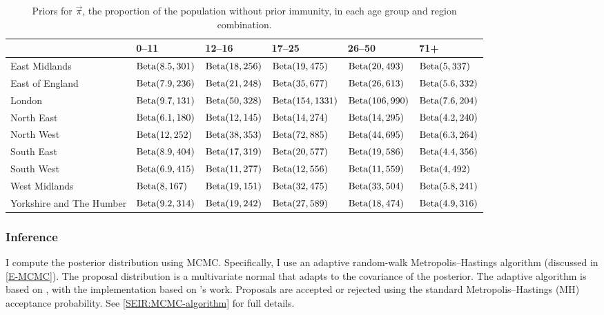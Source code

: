 \documentclass[thesis.tex]{subfiles}
\begin{document}
\begin{landscape}
\begin{table}
\centering
\begin{tabular}{l|lllll}
         & 0--11 & 12--16 & 17--25 & 26--50 & 71+ \\
        \hline
        East Midlands & $\operatorname{Beta}(8.5, 301)$ & $\operatorname{Beta}(18, 256)$ & $\operatorname{Beta}(19, 475)$ & $\operatorname{Beta}(20, 493)$ & $\operatorname{Beta}(5, 337)$ \\
        East of England & $\operatorname{Beta}(7.9, 236)$ & $\operatorname{Beta}(21, 248)$ & $\operatorname{Beta}(35, 677)$ & $\operatorname{Beta}(26, 613)$ & $\operatorname{Beta}(5.6, 332)$ \\
        London & $\operatorname{Beta}(9.7, 131)$ & $\operatorname{Beta}(50, 328)$ & $\operatorname{Beta}(154, 1331)$ & $\operatorname{Beta}(106, 990)$ & $\operatorname{Beta}(7.6, 204)$ \\
        North East & $\operatorname{Beta}(6.1, 180)$ & $\operatorname{Beta}(12, 145)$ & $\operatorname{Beta}(14, 274)$ & $\operatorname{Beta}(14, 295)$ & $\operatorname{Beta}(4.2, 240)$ \\
        North West & $\operatorname{Beta}(12, 252)$ & $\operatorname{Beta}(38, 353)$ & $\operatorname{Beta}(72, 885)$ & $\operatorname{Beta}(44, 695)$ & $\operatorname{Beta}(6.3, 264)$ \\
        South East & $\operatorname{Beta}(8.9, 404)$ & $\operatorname{Beta}(17, 319)$ & $\operatorname{Beta}(20, 577)$ & $\operatorname{Beta}(19, 586)$ & $\operatorname{Beta}(4.4, 356)$ \\
        South West & $\operatorname{Beta}(6.9, 415)$ & $\operatorname{Beta}(11, 277)$ & $\operatorname{Beta}(12, 556)$ & $\operatorname{Beta}(11, 559)$ & $\operatorname{Beta}(4, 492)$ \\
        West Midlands & $\operatorname{Beta}(8, 167)$ & $\operatorname{Beta}(19, 151)$ & $\operatorname{Beta}(32, 475)$ & $\operatorname{Beta}(33, 504)$ & $\operatorname{Beta}(5.8, 241)$ \\
        Yorkshire and The Humber & $\operatorname{Beta}(9.2, 314)$ & $\operatorname{Beta}(19, 242)$ & $\operatorname{Beta}(27, 589)$ & $\operatorname{Beta}(18, 474)$ & $\operatorname{Beta}(4.9, 316)$ \\
    \end{tabular}
\caption{Priors for $\vec{\pi}$, the proportion of the population without prior immunity, in each age group and region combination.}
\label{SEIR:table:immunity-prior}
\end{table}
\end{landscape}

\subsubsection{Inference} \label{SEIR:sec:inference}

I compute the posterior distribution using MCMC.
Specifically, I use an adaptive random-walk Metropolis--Hastings algorithm (discussed in \cref{E-MCMC}).
The proposal distribution is a multivariate normal that adapts to the covariance of the posterior.
The adaptive algorithm is based on \textcite[algorithm 4]{andrieuTutorial}, with the implementation based on \textcite{ghoshApproximate}'s work.
Proposals are accepted or rejected using the standard Metropolis--Hastings (MH) acceptance probability.
See \cref{SEIR:MCMC-algorithm} for full details.
\end{document}
